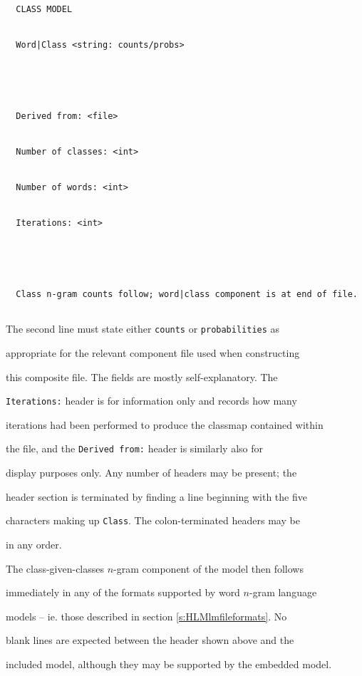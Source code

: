 \begin{verbatim}


  CLASS MODEL


  Word|Class <string: counts/probs>





  Derived from: <file>


  Number of classes: <int>


  Number of words: <int>


  Iterations: <int>





  Class n-gram counts follow; word|class component is at end of file.


\end{verbatim}


The second line must state either {\tt counts} or {\tt probabilities} as


appropriate for the relevant component file used when constructing


this composite file.  The fields are mostly self-explanatory.  The


{\tt Iterations:} header is for information only and records how many


iterations had been performed to produce the classmap contained within


the file, and the {\tt Derived from:} header is similarly also for


display purposes only.  Any number of headers may be present; the


header section is terminated by finding a line beginning with the five


characters making up {\tt Class}.  The colon-terminated headers may be


in any order.





The class-given-classes $n$-gram component of the model then follows


immediately in any of the formats supported by word $n$-gram language


models -- ie. those described in section \ref{s:HLMlmfileformats}.  No


blank lines are expected between the header shown above and the


included model, although they may be supported by the embedded model.





